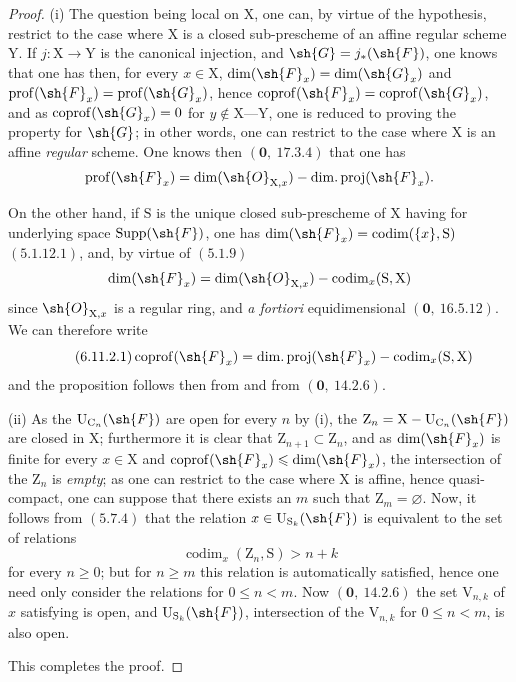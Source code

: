 \begin{proof}
(i) The question being local on $\mathrm{X}$, one can, by virtue of the hypothesis, restrict to the
case where $\mathrm{X}$ is a closed sub-prescheme of an affine regular scheme $\mathrm{Y}$. If $j:\mathrm{X}\to\mathrm{Y}$ is
the canonical injection, and $\sh{G}=j_*(\sh{F})$, one knows that one has then, for every $x\in\mathrm{X}$,
$\dim(\sh{F}_x)=\dim(\sh{G}_x)$ and $\operatorname{prof}(\sh{F}_x)=\operatorname{prof}(\sh{G}_x)$, hence $\operatorname{coprof}(\sh{F}_x)=\operatorname{coprof}(\sh{G}_x)$, and as
$\operatorname{coprof}(\sh{G}_x)=0$ for $y\notin\mathrm{X}\text{---}\mathrm{Y}$, one is reduced to proving the property for $\sh{G}$;
in other words, one can restrict to the case where $\mathrm{X}$ is an affine \emph{regular} scheme. One knows then $(\mathbf{0},~17.3.4)$
that one has
\[
  \operatorname{prof}(\sh{F}_x)=\dim(\sh{O}_{\mathrm{X},x})-\operatorname{dim.proj}(\sh{F}_x).
\]

On the other hand, if $\mathrm{S}$ is the unique closed sub-prescheme of $\mathrm{X}$ having for underlying space
$\operatorname{Supp}(\sh{F})$, one has $\dim(\sh{F}_x)=\operatorname{codim}(\{x\},\mathrm{S})$ $(5.1.12.1)$, and, by virtue of $(5.1.9)$
\[
  \dim(\sh{F}_x)=\dim(\sh{O}_{\mathrm{X},x})-\operatorname{codim}_x(\mathrm{S},\mathrm{X})
\]
since $\sh{O}_{\mathrm{X},x}$ is a regular ring, and \emph{a fortiori} equidimensional $(\mathbf{0},~16.5.12)$. We
can therefore write
\begin{equation}
\tag{6.11.2.1}
\label{IV.6.11.2.1}
  \operatorname{coprof}(\sh{F}_x)=\operatorname{dim.proj}(\sh{F}_x)-\operatorname{codim}_x(\mathrm{S},\mathrm{X})
\end{equation}
and the proposition follows then from  and from $(\mathbf{0},~14.2.6)$.


(ii) As the $\mathrm{U}_{\mathrm{C}_n}(\sh{F})$ are open for every $n$ by (i), the $\mathrm{Z}_n=\mathrm{X}-\mathrm{U}_{\mathrm{C}_n}(\sh{F})$
are closed in $\mathrm{X}$; furthermore it is clear that $\mathrm{Z}_{n+1}\subset\mathrm{Z}_n$, and as $\dim(\sh{F}_x)$ is finite
for every $x\in\mathrm{X}$ and $\operatorname{coprof}(\sh{F}_x)\leqslant\dim(\sh{F}_x)$, the intersection of the $\mathrm{Z}_n$ is \emph{empty}; as one can
restrict to the case where $\mathrm{X}$ is affine, hence quasi-compact, one can suppose that there exists an $m$
such that $\mathrm{Z}_m=\varnothing$. Now, it follows from $(5.7.4)$ that the relation $x\in\mathrm{U}_{\mathrm{S}_k}(\sh{F})$ is equivalent to the set of
relations
\begin{equation}
\tag{6.11.2.2}
\label{IV.6.11.2.2}
  \operatorname{codim}_x(\mathrm{Z}_n,\mathrm{S})>n+k
\end{equation}
for every $n\geqslant 0$; but for $n\geqslant m$ this relation is automatically satisfied, hence one
need only consider the relations  for $0\leqslant n<m$. Now $(\mathbf{0},~14.2.6)$
the set $\mathrm{V}_{n,k}$ of $x$ satisfying  is open, and $\mathrm{U}_{\mathrm{S}_k}(\sh{F})$, intersection of the $\mathrm{V}_{n,k}$
for $0\leqslant n<m$, is also open.

This completes the proof.
\end{proof}

